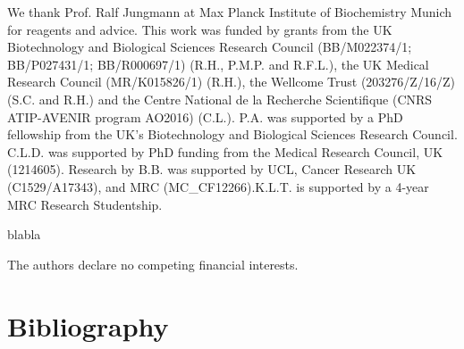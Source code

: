 \begin{acknowledgements}
 We thank Prof. Ralf Jungmann at Max Planck Institute of Biochemistry Munich for reagents and advice. This work was funded by grants from the UK Biotechnology and Biological Sciences Research Council (BB/M022374/1; BB/P027431/1; BB/R000697/1) (R.H., P.M.P. and R.F.L.), the UK Medical Research Council (MR/K015826/1) (R.H.), the Wellcome Trust (203276/Z/16/Z) (S.C. and R.H.) and the Centre National de la Recherche Scientifique (CNRS ATIP-AVENIR program AO2016) (C.L.). P.A. was supported by a PhD fellowship from the UK’s Biotechnology and Biological Sciences Research Council. C.L.D. was supported by PhD funding from the Medical Research Council, UK (1214605). Research by B.B. was supported by UCL, Cancer Research UK (C1529/A17343), and MRC (MC\_CF12266).K.L.T. is supported
    by a 4-year MRC Research Studentship.
\end{acknowledgements}


\begin{contributions}
 blabla
\end{contributions}

\begin{interests}
 The authors declare no competing financial interests.
\end{interests}

\section*{Bibliography}


